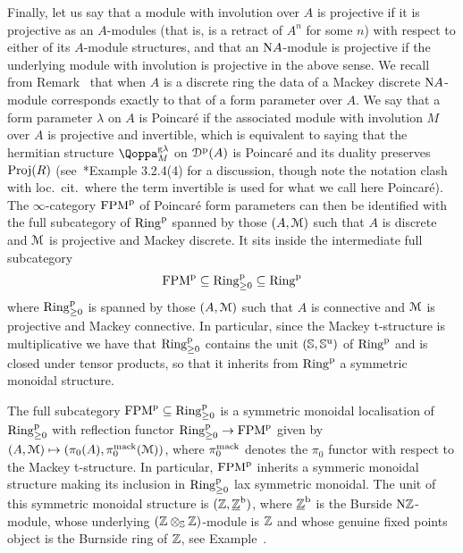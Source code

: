 Finally, let us say that a module with involution over $A$ is projective if it is projective 
as an $A$-modules (that is, is a retract of $A^n$ for some $n$) with respect to either of its $A$-module structures, and that an $\mathrm{N} A$-module is projective if the underlying module with involution is projective in the above sense. We recall from Remark~ that when $A$ is a discrete ring the data of a Mackey discrete $\mathrm{N} A$-module corresponds exactly to that of a form parameter over $A$. We say that a form parameter $\lambda$ on $A$ is Poincaré if the associated module with involution $M$ over $A$ is projective and invertible, which is equivalent to saying that 
the hermitian structure $\QF^{\g\lambda}_M$ on ${\mathcal D}^{\mathrm{p}}(A)$ is Poincaré and its duality preserves $\mathrm{Proj}(R)$ (see~\cite{comparison}*{Example 3.2.4(4)} for a discussion, though note the notation clash with loc.\ cit.\ where the term invertible is used for what we call here Poincaré). The $\infty$-category $\mathrm {FPM}^{\mathrm p}$ of Poincaré form parameters can then be identified with the full subcategory of $\mathrm{Ring}^{\mathrm{p}}$ spanned by those $(A,\mathcal{M})$ such that $A$ is discrete and $\mathcal{M}$ is projective and Mackey discrete. It sits inside the intermediate full subcategory 
\[
\mathrm {FPM}^{\mathrm p} \subseteq \mathrm{Ring}^{\mathrm{p}}_{\geq 0} \subseteq \mathrm{Ring}^{\mathrm{p}}
\]
where $\mathrm{Ring}^{\mathrm{p}}_{\geq 0}$ is spanned by those $(A,\mathcal{M})$ such that $A$ is connective and $\mathcal{M}$ is projective and Mackey connective.
In particular, since the Mackey t-structure is multiplicative we have that $\mathrm{Ring}^{\mathrm{p}}_{\geq 0}$ contains the unit $(\mathbb{S},\mathbb{S}^{\mathrm{u}})$ of $\mathrm{Ring}^{\mathrm{p}}$ and is closed under tensor products, so that it inherits from $\mathrm{Ring}^{\mathrm{p}}$ a symmetric monoidal structure.


\begin{proposition}%
\label{proposition:sym_mon_structure_on_cat_of_form_parameters}%
The full subcategory $\mathrm {FPM}^{\mathrm p} \subseteq \mathrm{Ring}^{\mathrm{p}}_{\geq 0}$ is a symmetric monoidal localisation of $\mathrm{Ring}^{\mathrm{p}}_{\geq 0}$ with reflection functor $\mathrm{Ring}^{\mathrm{p}}_{\geq 0} \to \mathrm {FPM}^{\mathrm p}$ given by $(A,\mathcal{M}) \mapsto (\pi_0(A),\pi^{\mathrm{mack}}_0(\mathcal{M}))$, where $\pi^{\mathrm{mack}}_0$ denotes the $\pi_0$ functor with respect to the Mackey t-structure. In particular, $\mathrm {FPM}^{\mathrm p}$ inherits a symmeric monoidal structure making its inclusion in $\mathrm{Ring}^{\mathrm{p}}_{\geq 0}$ lax symmetric monoidal. The unit of this symmetric monoidal structure is $(\ZZ,\uline{\ZZ}^{\burn})$, where $\uline{\ZZ}^{\burn}$ is the Burside $\mathrm{N}\mathbb{Z}$-module, whose underlying $(\mathbb{Z} \otimes_{\mathbb{S}} \mathbb{Z})$-module is $\mathbb{Z}$ and whose genuine fixed points object is the Burnside ring of $\mathbb{Z}$, see Example~. 
\end{proposition}

